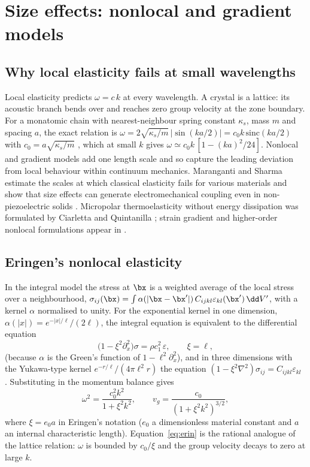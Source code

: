 \section{Size effects: nonlocal and gradient models}\label{sec:size}
\subsection{Why local elasticity fails at small wavelengths}
Local elasticity predicts $\omega=c\,k$ at every wavelength. A crystal is a lattice: its acoustic branch bends over and reaches zero group velocity at the zone boundary. For a monatomic chain with nearest-neighbour spring constant $\kappa_s$, mass $m$ and spacing $a$, the exact relation is $\omega=2\sqrt{\kappa_s/m}\,|\sin(ka/2)|=c_0k\,\mathrm{sinc}(ka/2)$ with $c_0=a\sqrt{\kappa_s/m}$ \citep{BornKarman1912}, which at small $k$ gives $\omega\simeq c_0k\,[1-(ka)^2/24]$. Nonlocal and gradient models add one length scale and so capture the leading deviation from local behaviour within continuum mechanics. Maranganti and Sharma \citep{Maranganti2007} estimate the scales at which classical elasticity fails for various materials and show that size effects can generate electromechanical coupling even in non-piezoelectric solids \citep{Maranganti2006}. Micropolar thermoelasticity without energy dissipation was formulated by Ciarletta \citep{Ciarletta1999} and Quintanilla \citep{Quintanilla2002}; strain gradient and higher-order nonlocal formulations appear in \citep{Gao2007,Lim2015,Ke2014}.

\subsection{Eringen's nonlocal elasticity}
In the integral model the stress at $\bx$ is a weighted average of the local stress over a neighbourhood,
$\sigma_{ij}(\bx)=\int\alpha(|\bx-\bx'|)\,C_{ijkl}\varepsilon_{kl}(\bx')\,\dd V'$, with a kernel $\alpha$ normalised to unity. For the exponential kernel in one dimension, $\alpha(|x|)=e^{-|x|/\ell}/(2\ell)$, the integral equation is equivalent to the differential equation
\begin{equation}
\bigl(1-\xi^2\partial_x^2\bigr)\sigma=\rho c_1^2\,\varepsilon,\qquad \xi=\ell,\label{eq:eringen}
\end{equation}
(because $\alpha$ is the Green's function of $1-\ell^2\partial_x^2$), and in three dimensions with the Yukawa-type kernel $e^{-r/\ell}/(4\pi\ell^2r)$ the equation $(1-\xi^2\nabla^2)\sigma_{ij}=C_{ijkl}\varepsilon_{kl}$ \citep{Eringen1972,Eringen1983,Eringen2002}. Substituting in the momentum balance gives
\begin{equation}
\omega^2=\frac{c_0^2k^2}{1+\xi^2k^2},\qquad v_g=\frac{c_0}{(1+\xi^2k^2)^{3/2}},\label{eq:erin}
\end{equation}
where $\xi=e_0a$ in Eringen's notation ($e_0$ a dimensionless material constant and $a$ an internal characteristic length). Equation~\eqref{eq:erin} is the rational analogue of the lattice relation: $\omega$ is bounded by $c_0/\xi$ and the group velocity decays to zero at large $k$.

